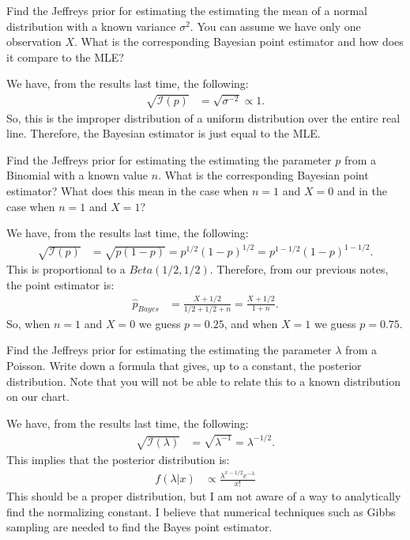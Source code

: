 
Find the Jeffreys prior for estimating the estimating the mean of a normal
distribution with a known variance $\sigma^2$. You can assume we have only one
observation $X$. What is the corresponding
Bayesian point estimator and how does it compare to the MLE?


We have, from the results last time, the following:
\begin{align*}
\sqrt{\mathcal{I}(p)} &= \sqrt{\sigma^{-2}} \propto 1.
\end{align*}
So, this is the improper distribution of a uniform distribution over the entire
real line. Therefore, the Bayesian estimator is just equal to the MLE.


Find the Jeffreys prior for estimating the estimating the parameter $p$ from a
Binomial with a known value $n$. What is the corresponding Bayesian point estimator?
What does this mean in the case when $n=1$ and $X=0$ and in the case when $n=1$ and $X=1$?


We have, from the results last time, the following:
\begin{align*}
\sqrt{\mathcal{I}(p)} &= \sqrt{p(1-p)} = p^{1/2} (1 - p)^{1/2} = p^{1-1/2} (1-p)^{1-1/2}.
\end{align*}
This is proportional to a $Beta(1/2,1/2)$. Therefore, from our previous notes, the 
point estimator is:
\begin{align*}
\widehat{p}_{Bayes} &= \frac{X + 1/2}{1/2 + 1/2 + n} = \frac{X + 1/2}{1 + n}.
\end{align*}
So, when $n=1$ and $X=0$ we guess $p=0.25$, and when $X=1$ we guess $p=0.75$.


Find the Jeffreys prior for estimating the estimating the parameter $\lambda$ from
a Poisson. Write down a formula that gives, up to a constant,
the posterior distribution. Note that you will not be able to relate this to a 
known distribution on our chart.


We have, from the results last time, the following:
\begin{align*}
\sqrt{\mathcal{I}(\lambda)} &= \sqrt{\lambda^{-1}} = \lambda^{-1/2}.
\end{align*}
This implies that the posterior distribution is:
\begin{align*}
f(\lambda | x) &\propto \frac{\lambda^{x-1/2} e^{-\lambda}}{x!}
\end{align*}
This should be a proper distribution, but I am not aware of a way to analytically
find the normalizing constant. I believe that numerical techniques such as Gibbs
sampling are needed to find the Bayes point estimator.

